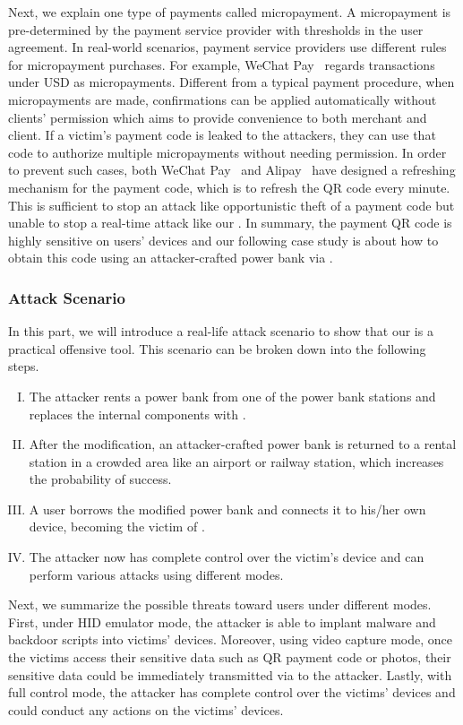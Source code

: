 Next, we explain one type of payments called micropayment. A micropayment is pre-determined by the payment
service provider with thresholds in the user agreement. In real-world scenarios, payment service providers use different rules
for micropayment purchases. For example, WeChat
Pay~\cite{Wechat-pay} regards transactions under USD  as
micropayments.  Different from a typical payment procedure, when micropayments
are made, confirmations can be applied automatically without clients'
permission which aims to provide convenience to both merchant and client.  If a
victim's payment code is leaked to the attackers, they can use that code to
authorize multiple micropayments without needing permission.  In order to prevent such
cases, both WeChat Pay~\cite{Wechat-pay} and Alipay~\cite{AliPay} have designed a refreshing mechanism for the
payment code, which is to refresh the QR code every minute. This is sufficient
to stop an attack like opportunistic theft of a payment code but unable to stop a real-time attack like our
\tool.  In summary, the payment QR code is highly sensitive on users' devices
and our following case study is about how to obtain this code using an
attacker-crafted power bank via \tool.

\subsubsection{Attack Scenario}

In this part, we will introduce a real-life attack scenario to show that our
\tool is a practical offensive tool.  This scenario can be broken down into the
following steps.

\begin{enumerate}[I. ]
	\item The attacker rents a power bank from one of the power bank stations and replaces the internal components with \tool.
	\item After the modification, an attacker-crafted power bank is returned to a rental station in a crowded area like an airport or railway station, which increases the probability of success.
	\item A user borrows the modified power bank and connects it to his/her own device, becoming the victim of \tool.
	\item The attacker now has complete control over the victim's device and can perform various attacks using different modes.
\end{enumerate}

Next, we summarize the possible threats toward users under different modes.
First, under \ac{HID} emulator mode, the attacker is able to implant malware and backdoor scripts into victims' devices. Moreover, using video capture mode, once the victims access their sensitive data such as QR payment  code or photos, their sensitive data could be immediately transmitted via \tool to the attacker. Lastly, with full control mode, the attacker has complete control over the victims' devices and could conduct any actions on the victims' devices.

